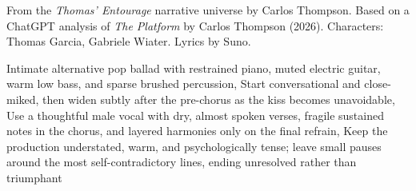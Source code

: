 
\begin{notes}
From the \emph{Thomas’ Entourage} narrative universe by Carlos Thompson. Based on a ChatGPT analysis of \emph{The Platform} by Carlos Thompson (2026). Characters: Thomas Garcia, Gabriele Wiater. Lyrics by Suno.
\end{notes}
\begin{style}
Intimate alternative pop ballad with restrained piano, muted electric guitar, warm low bass, and sparse brushed percussion, Start conversational and close-miked, then widen subtly after the pre-chorus as the kiss becomes unavoidable, Use a thoughtful male vocal with dry, almost spoken verses, fragile sustained notes in the chorus, and layered harmonies only on the final refrain, Keep the production understated, warm, and psychologically tense; leave small pauses around the most self-contradictory lines, ending unresolved rather than triumphant
\end{style}
